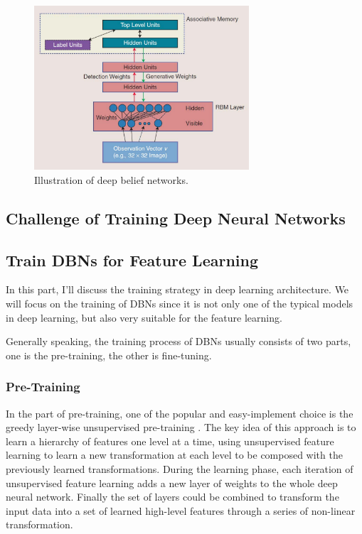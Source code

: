 \documentclass[conference]{IEEEtran}
\begin{document}
\begin{figure}[t]
\centering
\includegraphics[width=80mm]{dbn.pdf}
\caption{Illustration of deep belief networks\cite{new_frontier}.}
\label{fig:dbn}
\end{figure}

\subsection{Challenge of Training Deep Neural Networks}

\subsection{Train DBNs for Feature Learning}

In this part, I'll discuss the training strategy in deep learning architecture. We will focus on the training of DBNs since it is not only one of the typical models in deep learning, but also very suitable for the feature learning.

Generally speaking, the training process of DBNs usually consists of two parts, one is the pre-training, the other is fine-tuning.

\subsubsection{Pre-Training}

In the part of pre-training, one of the popular and easy-implement choice is the greedy layer-wise unsupervised pre-training \cite{greedy}. The key idea of this approach is to learn a hierarchy of features one level at a time, using unsupervised feature learning to learn a new transformation at each level to be composed with the previously learned transformations. During the learning phase, each iteration of unsupervised feature learning adds a new layer of weights to the whole deep neural network. Finally the set of layers could be combined to transform the input data into a set of learned high-level features through a series of non-linear transformation.
\end{document}
